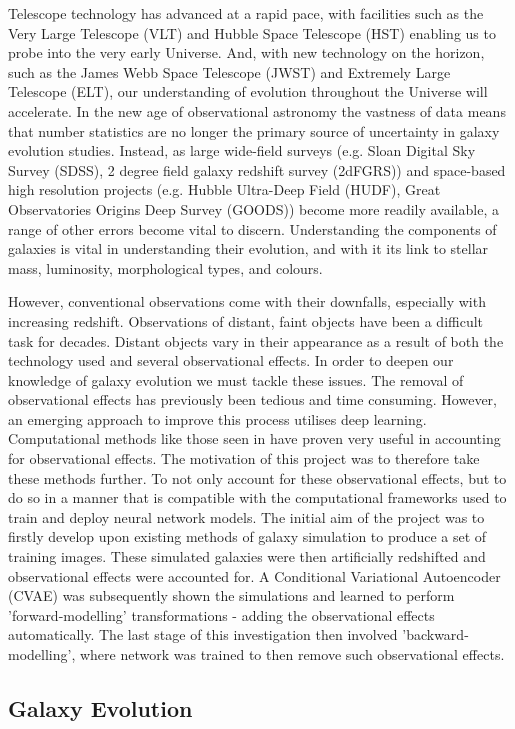 \documentclass[fleqn,usenatbib]{mnras}
\begin{document}
Telescope technology has advanced at a rapid pace, with facilities such as the Very Large Telescope (VLT) and Hubble Space Telescope (HST) enabling us to probe into the very early Universe. And, with new technology on the horizon, such as the James Webb Space Telescope (JWST) and Extremely Large Telescope (ELT), our understanding of evolution throughout the Universe will accelerate. In the new age of observational astronomy the vastness of data means that number statistics are no longer the primary source of uncertainty in galaxy evolution studies. Instead, as large wide-field surveys (e.g. Sloan Digital Sky Survey (SDSS), 2 degree field galaxy redshift survey (2dFGRS)) and space-based high resolution projects (e.g. Hubble Ultra-Deep Field (HUDF), Great Observatories Origins Deep Survey (GOODS)) become more readily available, a range of other errors become vital to discern. Understanding the components of galaxies is vital in understanding their evolution, and with it its link to stellar mass, luminosity, morphological types, and colours. 

However, conventional observations come with their downfalls, especially with increasing redshift. Observations of distant, faint objects have been a difficult task for decades. Distant objects vary in their appearance as a result of both the technology used and several observational effects. In order to deepen our knowledge of galaxy evolution we must tackle these issues. The removal of observational effects has previously been tedious and time consuming. However, an emerging approach to improve this process utilises deep learning. Computational methods like those seen in \citet{Barden2008} have proven very useful in accounting for observational effects. The motivation of this project was to therefore take these methods further. To not only account for these observational effects, but to do so in a manner that is compatible with the computational frameworks used to train and deploy neural network models. The initial aim of the project was to firstly develop upon existing methods of galaxy simulation to produce a set of training images. These simulated galaxies were then artificially redshifted and observational effects were accounted for. A Conditional Variational Autoencoder (CVAE) was subsequently shown the simulations and learned to perform 'forward-modelling' transformations - adding the observational effects automatically. The last stage of this investigation then involved 'backward-modelling', where network was trained to then remove such observational effects. 
\subsection{Galaxy Evolution}
\label{sec:evolution}
\end{document}
